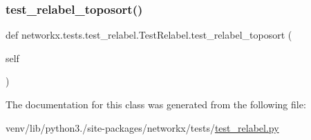 \subsubsection{\texorpdfstring{test\+\_\+relabel\+\_\+toposort()}{test\_relabel\_toposort()}}
{\footnotesize\ttfamily def networkx.\+tests.\+test\+\_\+relabel.\+Test\+Relabel.\+test\+\_\+relabel\+\_\+toposort (\begin{DoxyParamCaption}\item[{}]{self }\end{DoxyParamCaption})}



The documentation for this class was generated from the following file\+:\begin{DoxyCompactItemize}
\item 
venv/lib/python3./site-\/packages/networkx/tests/\hyperlink{test__relabel_8py}{test\+\_\+relabel.\+py}\end{DoxyCompactItemize}
